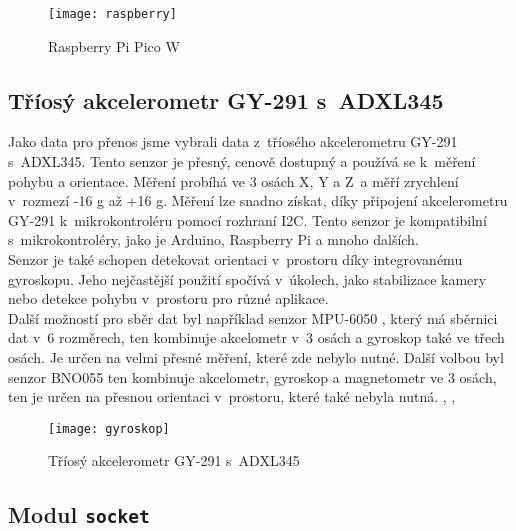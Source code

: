 \documentclass[12pt]{report}			%
\begin{document}
\begin{figure}[h]
\caption{Raspberry Pi Pico W}
\centering
\texttt{[image: raspberry]}
\end{figure}

\subsection{Tříosý akcelerometr GY-291 s~ADXL345}

Jako data pro přenos jsme vybrali data
z~tříosého akcelerometru GY-291 s~ADXL345. Tento senzor je přesný, cenově dostupný a používá se k~měření pohybu a orientace. Měření probíhá ve 3 osách X, Y a Z~a měří zrychlení v~rozmezí -16 g až +16 g. Měření lze snadno získat, díky připojení akcelerometru GY-291 k~mikrokontroléru pomocí rozhraní I2C. Tento senzor je kompatibilní s~mikrokontroléry, jako je Arduino, Raspberry Pi a mnoho dalších.
\\
Senzor je také schopen detekovat orientaci v~prostoru díky integrovanému gyroskopu. Jeho nejčastější použití spočívá v~úkolech, jako stabilizace kamery nebo detekce pohybu v~prostoru pro různé aplikace.
\\
Další možností pro sběr dat byl například senzor MPU-6050
, který má sběrnici dat v~6 rozměrech, ten kombinuje akcelometr v~3 osách a gyroskop také ve třech osách. Je určen na velmi přesné měření, které zde nebylo nutné. Další volbou byl senzor BNO055
 ten kombinuje akcelometr, gyroskop a magnetometr ve 3 osách, ten je určen na přesnou orientaci v~prostoru, které také nebyla nutná. \cite{gyroskop}, \cite{MPU}, \cite{BNO}

\begin{figure}[h]
\caption{Tříosý akcelerometr GY-291 s~ADXL345}
\centering
\texttt{[image: gyroskop]}
\end{figure}

\subsection{Modul \texttt{socket}}
\end{document}
